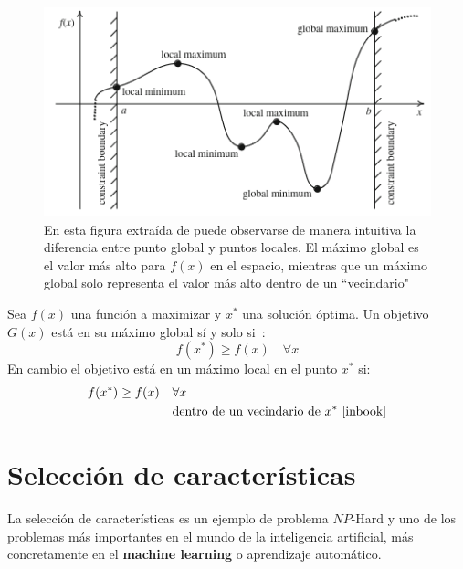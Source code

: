 \begin{figure}[htp]
    \begin{center}
        \includegraphics[width=1\textwidth]{imagenes/min-max_points.png}
    \end{center}
    \caption[Puntos globales y locales]{En esta figura extraída de \cite{inbook} puede observarse de manera intuitiva la diferencia entre punto global y puntos locales. El máximo global es el valor más alto para $f(x)$ en el espacio, mientras que un máximo global solo representa el valor más alto dentro de un ``vecindario"}
\end{figure}

Sea $f(x)$ una función a maximizar y $x^*$ una solución óptima. Un objetivo $G(x)$ está en su máximo global sí y solo si~\cite{inbook}:
\begin{equation}
    f(x^*) \geq f(x) \quad \forall x
\end{equation}
En cambio el objetivo está en un máximo local en el punto $x^*$ si:
\begin{equation}
    \begin{split}
        f(x^*) \geq f(x) \quad & \forall x \\
        & \text{dentro de un vecindario de } x^*\text{~\cite{inbook}}
    \end{split}
\end{equation}

\section{Selección de características}
La selección de características es un ejemplo de problema $NP$-Hard y uno de los problemas más importantes en el mundo de la inteligencia artificial, más concretamente en el \textbf{machine learning} o aprendizaje automático.

